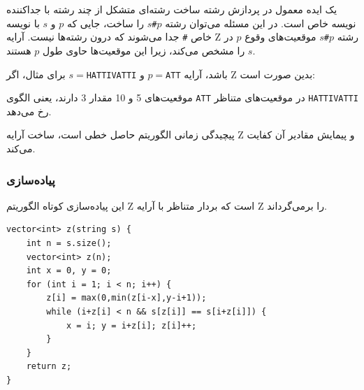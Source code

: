 یک ایده معمول در پردازش رشته ساخت رشته‌ای متشکل از چند رشته با جداکننده نویسه خاص است. در این مسئله می‌توان رشته $p$\texttt{\#}$s$ را ساخت، جایی که $p$ و $s$ با نویسه خاص \texttt{\#} جدا می‌شوند که درون رشته‌ها نیست. آرایه Z رشته $p$\texttt{\#}$s$ موقعیت‌های وقوع $p$ در $s$ را مشخص می‌کند، زیرا این موقعیت‌ها حاوی طول $p$ هستند.

برای مثال، اگر $s=$\texttt{HATTIVATTI} و $p=$\texttt{ATT} باشد، آرایه Z بدین صورت است:

\begin{center}
\end{center}

موقعیت‌های 5 و 10 مقدار 3 دارند، یعنی الگوی \texttt{ATT} در موقعیت‌های متناظر \texttt{HATTIVATTI} رخ می‌دهد.

پیچیدگی زمانی الگوریتم حاصل خطی است، ساخت آرایه Z و پیمایش مقادیر آن کفایت می‌کند.

\subsubsection{پیاده‌سازی}

این پیاده‌سازی کوتاه الگوریتم Z است که بردار متناظر با آرایه Z را برمی‌گرداند.

\begin{lstlisting}
vector<int> z(string s) {
    int n = s.size();
    vector<int> z(n);
    int x = 0, y = 0;
    for (int i = 1; i < n; i++) {
        z[i] = max(0,min(z[i-x],y-i+1));
        while (i+z[i] < n && s[z[i]] == s[i+z[i]]) {
            x = i; y = i+z[i]; z[i]++;
        }
    }
    return z;
}
\end{lstlisting}